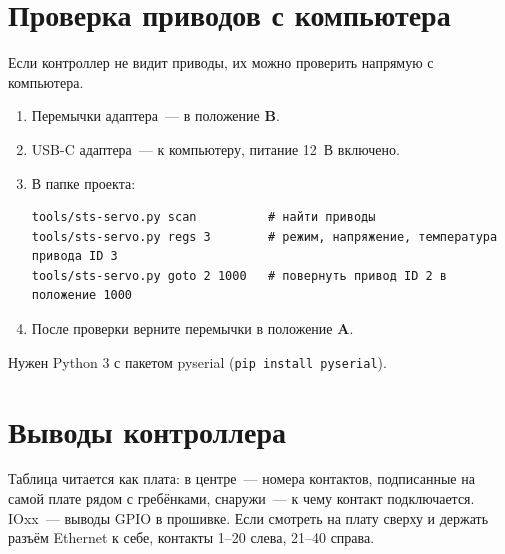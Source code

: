 \documentclass[a4paper,11pt]{article}
\begin{document}
\appendix
\section{Проверка приводов с компьютера}\label{sec:pc}

Если контроллер не видит приводы, их можно проверить напрямую с компьютера.

\begin{enumerate}
  \item Перемычки адаптера~— в положение \textbf{B}.
  \item USB-C адаптера~— к компьютеру, питание 12~В включено.
  \item В папке проекта:
\begin{verbatim}
tools/sts-servo.py scan          # найти приводы
tools/sts-servo.py regs 3        # режим, напряжение, температура привода ID 3
tools/sts-servo.py goto 2 1000   # повернуть привод ID 2 в положение 1000
\end{verbatim}
  \item После проверки верните перемычки в положение \textbf{A}.
\end{enumerate}

Нужен Python 3 с пакетом pyserial (\texttt{pip install pyserial}).

\section{Выводы контроллера}\label{sec:pins}

Таблица читается как плата: в центре~— номера контактов, подписанные на самой плате рядом с гребёнками,
снаружи~— к чему контакт подключается. IOxx~— выводы GPIO в прошивке.
Если смотреть на плату сверху и держать разъём Ethernet к себе, контакты 1--20 слева, 21--40 справа.
\end{document}

